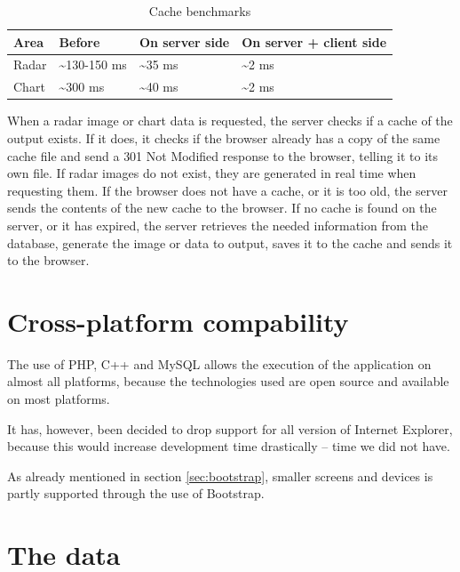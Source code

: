 \begin{table}[htbp]
\centering
\begin{tabular}{|l|l|l|l|}
\hline
\textbf{Area} & \textbf{Before} & \textbf{On server side} & \textbf{On server + client side}\\
\hline
Radar & \textasciitilde 130-150 ms & \textasciitilde 35 ms & \textasciitilde 2 ms\\
\hline
Chart & \textasciitilde 300 ms & \textasciitilde 40 ms & \textasciitilde 2 ms\\
\hline
\end{tabular}
\label{tab:cache_benchmarks}
\caption{Cache benchmarks}
\end{table}

When a radar image or chart data is requested, the server checks if a cache of the output exists. If it does, it checks if the browser already has a copy of the same cache file and send a \textsf{301 Not Modified} response to the browser, telling it to its own file. If radar images do not exist, they are generated in real time when requesting them.
If the browser does not have a cache, or it is too old, the server sends the contents of the new cache to the browser.
If no cache is found on the server, or it has expired, the server retrieves the needed information from the database, generate the image or data to output, saves it to the cache and sends it to the browser.

\section{Cross-platform compability}
\label{sec:cross-platform}
The use of PHP, C++ and MySQL allows the execution of the application on almost all platforms, because the technologies used are open source and available on most platforms.

It has, however, been decided to drop support for all version of Internet Explorer, because this would increase development time drastically -- time we did not have.

As already mentioned in section \ref{sec:bootstrap}, smaller screens and devices is partly supported through the use of Bootstrap.
\section{The data}
